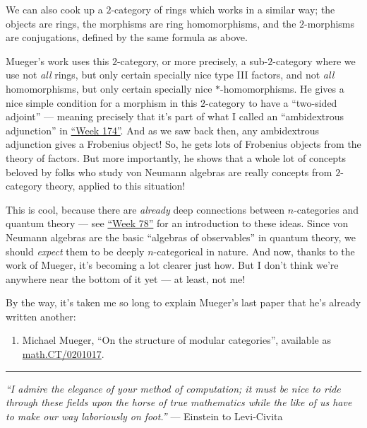 \documentclass{article}
\def\tightlist{}
\begin{document}
We can also cook up a \(2\)-category of rings which works in a similar
way; the objects are rings, the morphisms are ring homomorphisms, and
the \(2\)-morphisms are conjugations, defined by the same formula as
above.

Mueger's work uses this \(2\)-category, or more precisely, a
sub-\(2\)-category where we use not \emph{all} rings, but only certain
specially nice type III factors, and not \emph{all} homomorphisms, but
only certain specially nice \(*\)-homomorphisms. He gives a nice simple
condition for a morphism in this \(2\)-category to have a ``two-sided
adjoint'' --- meaning precisely that it's part of what I called an
``ambidextrous adjunction'' in \protect\hyperlink{week174}{``Week
174''}. And as we saw back then, any ambidextrous adjunction gives a
Frobenius object! So, he gets lots of Frobenius objects from the theory
of factors. But more importantly, he shows that a whole lot of concepts
beloved by folks who study von Neumann algebras are really concepts from
\(2\)-category theory, applied to this situation!

This is cool, because there are \emph{already} deep connections between
\(n\)-categories and quantum theory --- see
\protect\hyperlink{week78}{``Week 78''} for an introduction to these
ideas. Since von Neumann algebras are the basic ``algebras of
observables'' in quantum theory, we should \emph{expect} them to be
deeply \(n\)-categorical in nature. And now, thanks to the work of
Mueger, it's becoming a lot clearer just how. But I don't think we're
anywhere near the bottom of it yet --- at least, not me!

By the way, it's taken me so long to explain Mueger's last paper that
he's already written another:

\begin{enumerate}
\def\labelenumi{\arabic{enumi})}
\setcounter{enumi}{15}
\tightlist
\item
  Michael Mueger, ``On the structure of modular categories'', available
  as \href{http://www.arXiv.org/abs/math.CT/0201017}{math.CT/0201017}.
\end{enumerate}

\begin{center}\rule{0.5\linewidth}{0.5pt}\end{center}

\emph{``I admire the elegance of your method of computation; it must be
nice to ride through these fields upon the horse of true mathematics
while the like of us have to make our way laboriously on foot.''} ---
Einstein to Levi-Civita
\end{document}
